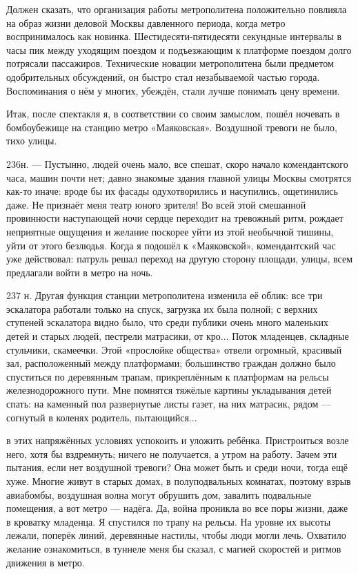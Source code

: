 Должен сказать, что организация работы метрополитена положительно повлияла на образ жизни деловой Москвы давленного периода, когда метро воспринималось как новинка. Шестидесяти-пятидесяти секундные интервалы в часы пик между уходящим поездом и подъезжающим к платформе поездом долго потрясали пассажиров. Технические новации метрополитена были предметом одобрительных обсуждений, он быстро стал незабываемой частью города. Воспоминания о нём у многих, убеждён, стали лучше понимать цену времени.

Итак, после спектакля я, в соответствии со своим замыслом, пошёл ночевать в бомбоубежище на станцию метро «Маяковская». Воздушной тревоги не было, тихо улицы.

236н. — Пустынно, людей очень мало, все спешат, скоро начало комендантского часа, машин почти нет; давно знакомые здания главной улицы Москвы смотрятся как-то иначе: вроде бы их фасады одухотворились и насупились, ощетинились даже. Не признаёт меня театр юного зрителя! Во всей этой смешанной провинности наступающей ночи сердце переходит на тревожный ритм, рождает неприятные ощущения и желание поскорее уйти из этой необычной тишины, уйти от этого безлюдья. Когда я подошёл к «Маяковской», комендантский час уже действовал: патруль решал переход на другую сторону площади, улицы, всем предлагали войти в метро на ночь.

237 н.
Другая функция станции метрополитена изменила её облик: все три эскалатора работали только на спуск, загрузка их была полной; с верхних ступеней эскалатора видно было, что среди публики очень много маленьких детей и старых людей, пестрели матрасики, от кро...
Поток младенцев, складные стульчики, скамеечки. Этой «прослойке общества» отвели огромный, красивый зал, расположенный между платформами; большинство граждан должно было спуститься по деревянным трапам, прикреплённым к платформам на рельсы железнодорожного пути. Мне помнятся тяжёлые картины укладывания детей спать: на каменный пол развернутые листы газет, на них матрасик, рядом — согнутый в коленях родитель, пытающийся...

в этих напряжённых условиях успокоить и уложить ребёнка. Пристроиться возле него, хотя бы вздремнуть; ничего не получается, а утром на работу. Зачем эти пытания, если нет воздушной тревоги? Она может быть и среди ночи, тогда ещё хуже. Многие живут в старых домах, в полуподвальных комнатах, поэтому взрыв авиабомбы, воздушная волна могут обрушить дом, завалить подвальные помещения, а вот метро — надёга. Да, война проникла во все поры жизни, даже в кроватку младенца. Я спустился по трапу на рельсы. На уровне их высоты лежали, поперёк линий, деревянные настилы, чтобы люди могли лечь. Охватило желание ознакомиться, в туннеле меня бы сказал, с магией скоростей и ритмов движения в метро.

